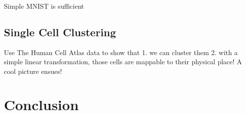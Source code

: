 \documentclass[twoside,11pt]{article}
\begin{document}
Simple MNIST is sufficient

\subsection{Single Cell Clustering}
\label{subsec:tcga}

Use The Human Cell Atlas data to show that 1. we can cluster them 2. with a simple linear transformation, those cells are mappable to their physical place! A cool picture ensues!
\cite{weinstein2013cancer}

\section{Conclusion}
\label{sec:conclusion}


\newpage

\appendix


\vskip 0.2in

\end{document}
